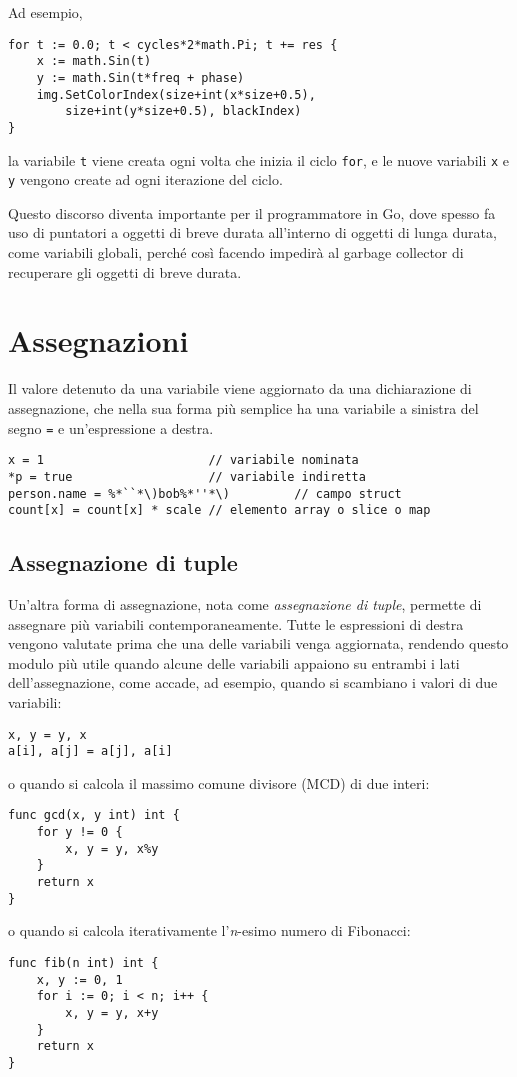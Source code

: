 Ad esempio,
\begin{lstlisting}[frame=single, label={lst:lstlisting1-3-4.1}]
for t := 0.0; t < cycles*2*math.Pi; t += res {
    x := math.Sin(t)
    y := math.Sin(t*freq + phase)
    img.SetColorIndex(size+int(x*size+0.5),
        size+int(y*size+0.5), blackIndex)
}
\end{lstlisting}
la variabile \verb|t| viene creata ogni volta che inizia il ciclo \verb|for|, e le nuove variabili \verb|x| e \verb|y| vengono create ad ogni iterazione del ciclo.

Questo discorso diventa importante per il programmatore in Go, dove spesso fa uso di puntatori a oggetti di breve durata all'interno di oggetti di lunga durata, come variabili globali, perché così facendo impedirà al garbage collector di recuperare gli oggetti di breve durata.


\section{Assegnazioni}
\label{sec:assegnazioni}%
Il valore detenuto da una variabile viene aggiornato da una dichiarazione di assegnazione, che nella sua forma più semplice ha una variabile a sinistra del segno \verb|=| e un'espressione a destra.
\begin{lstlisting}[frame=single, label={lst:lstlisting1-4.1}]
x = 1                       // variabile nominata
*p = true                   // variabile indiretta
person.name = %*``*\)bob%*''*\)         // campo struct
count[x] = count[x] * scale // elemento array o slice o map
\end{lstlisting}

\subsection{Assegnazione di tuple}
\label{subsec:assegnazione_di_tuple}%
Un'altra forma di assegnazione, nota come \textit{assegnazione di tuple}, permette di assegnare più variabili contemporaneamente.
Tutte le espressioni di destra vengono valutate prima che una delle variabili venga aggiornata, rendendo questo modulo più utile quando alcune delle variabili appaiono su entrambi i lati dell'assegnazione, come accade, ad esempio, quando si scambiano i valori di due variabili:
\begin{lstlisting}[frame=single, label={lst:lstlisting1-4-1.1}]
x, y = y, x
a[i], a[j] = a[j], a[i]
\end{lstlisting}
o quando si calcola il massimo comune divisore (MCD) di due interi:
\begin{lstlisting}[frame=single, label={lst:lstlisting1-4-1.2}]
func gcd(x, y int) int {
    for y != 0 {
        x, y = y, x%y
    }
    return x
}
\end{lstlisting}
o quando si calcola iterativamente l'\textit{n}-esimo numero di Fibonacci:
\begin{lstlisting}[frame=single, label={lst:lstlisting1-4-1.3}]
func fib(n int) int {
    x, y := 0, 1
    for i := 0; i < n; i++ {
        x, y = y, x+y
    }
    return x
}
\end{lstlisting}


